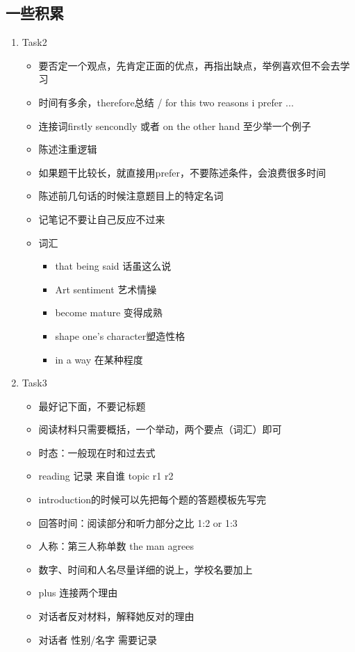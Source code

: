\documentclass[UTF8]{ctexart}
\begin{document}
\subsection{一些积累}
\begin{enumerate}
\item Task2
\begin{itemize}
  \item 要否定一个观点，先肯定正面的优点，再指出缺点，举例喜欢但不会去学习
  \item 时间有多余，therefore总结 / for this two reasons i prefer ...
  \item 连接词firstly sencondly 或者 on the other hand 至少举一个例子
  \item 陈述注重逻辑
  \item 如果题干比较长，就直接用prefer，不要陈述条件，会浪费很多时间
  \item 陈述前几句话的时候注意题目上的特定名词
  \item 记笔记不要让自己反应不过来
  \item 词汇
  \begin{itemize}
    \item that being said 话虽这么说
    \item Art sentiment 艺术情操
    \item become mature 变得成熟
    \item shape one's character塑造性格
    \item in a way 在某种程度
  \end{itemize}
\end{itemize}
\item Task3
\begin{itemize}
  \item 最好记下面，不要记标题
  \item 阅读材料只需要概括，一个举动，两个要点（词汇）即可
  \item 时态：一般现在时和过去式
  \item reading 记录 来自谁 topic r1 r2
  \item introduction的时候可以先把每个题的答题模板先写完
  \item 回答时间：阅读部分和听力部分之比 1:2 or 1:3
  \item 人称：第三人称单数 the man agrees
  \item 数字、时间和人名尽量详细的说上，学校名要加上
  \item plus 连接两个理由
  \item 对话者反对材料，解释她反对的理由
  \item 对话者 性别/名字 需要记录

\end{itemize}
\end{enumerate}
\end{document}
